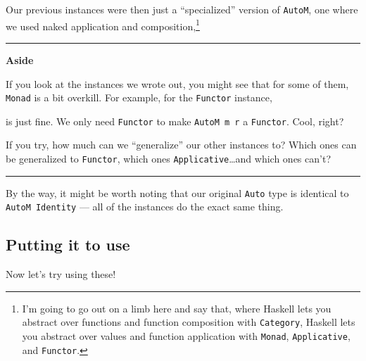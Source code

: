 \documentclass[]{article}
\newenvironment{Shaded}{}{}
\newcommand{\KeywordTok}[1]{\textcolor[rgb]{0.00,0.44,0.13}{\textbf{{#1}}}}
\newcommand{\DataTypeTok}[1]{\textcolor[rgb]{0.56,0.13,0.00}{{#1}}}
\newcommand{\OtherTok}[1]{\textcolor[rgb]{0.00,0.44,0.13}{{#1}}}
\newcommand{\FunctionTok}[1]{\textcolor[rgb]{0.02,0.16,0.49}{{#1}}}
\newcommand{\NormalTok}[1]{{#1}}
\begin{document}
Our previous instances were then just a ``specialized'' version of
\texttt{AutoM}, one where we used naked application and
composition,\footnote{I'm going to go out on a limb here and say that,
  where Haskell lets you abstract over functions and function
  composition with \texttt{Category}, Haskell lets you abstract over
  values and function application with \texttt{Monad},
  \texttt{Applicative}, and \texttt{Functor}.}

\begin{center}\rule{0.5\linewidth}{\linethickness}\end{center}

\textbf{Aside}

If you look at the instances we wrote out, you might see that for some
of them, \texttt{Monad} is a bit overkill. For example, for the
\texttt{Functor} instance,

\begin{Shaded}
\end{Shaded}

is just fine. We only need \texttt{Functor} to make \texttt{AutoM\ m\ r}
a \texttt{Functor}. Cool, right?

If you try, how much can we ``generalize'' our other instances to? Which
ones can be generalized to \texttt{Functor}, which ones
\texttt{Applicative}\ldots{}and which ones can't?

\begin{center}\rule{0.5\linewidth}{\linethickness}\end{center}

By the way, it might be worth noting that our original \texttt{Auto}
type is identical to \texttt{AutoM\ Identity} --- all of the instances
do the exact same thing.

\subsection{Putting it to use}\label{putting-it-to-use}

Now let's try using these!
\end{document}
